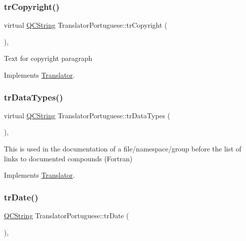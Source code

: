 \subsubsection{\texorpdfstring{trCopyright()}{trCopyright()}}
{\footnotesize\ttfamily virtual \mbox{\hyperlink{class_q_c_string}{Q\+C\+String}} Translator\+Portuguese\+::tr\+Copyright (\begin{DoxyParamCaption}{ }\end{DoxyParamCaption})\hspace{0.3cm}{\ttfamily [inline]}, {\ttfamily [virtual]}}

Text for copyright paragraph 

Implements \mbox{\hyperlink{class_translator}{Translator}}.

\mbox{\label{class_translator_portuguese_ae093d4bfe038bacb3f4c0313196db34f}} 
\subsubsection{\texorpdfstring{trDataTypes()}{trDataTypes()}}
{\footnotesize\ttfamily virtual \mbox{\hyperlink{class_q_c_string}{Q\+C\+String}} Translator\+Portuguese\+::tr\+Data\+Types (\begin{DoxyParamCaption}{ }\end{DoxyParamCaption})\hspace{0.3cm}{\ttfamily [inline]}, {\ttfamily [virtual]}}

This is used in the documentation of a file/namespace/group before the list of links to documented compounds (Fortran) 

Implements \mbox{\hyperlink{class_translator}{Translator}}.

\mbox{\label{class_translator_portuguese_a8cf39fc583129912800db26379efe8b5}} 
\subsubsection{\texorpdfstring{trDate()}{trDate()}}
{\footnotesize\ttfamily \mbox{\hyperlink{class_q_c_string}{Q\+C\+String}} Translator\+Portuguese\+::tr\+Date (\begin{DoxyParamCaption}{ }\end{DoxyParamCaption})\hspace{0.3cm}{\ttfamily [inline]}, {\ttfamily [virtual]}}

